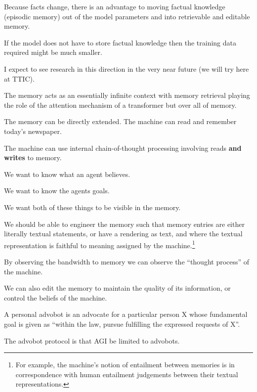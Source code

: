 {\vfill
Because facts change, there is an advantage to moving factual knowledge (episodic memory) out of the model parameters
and into retrievable and editable memory.

\vfill
If the model does not have to store factual knowledge then the training data required might be much smaller.

\vfill
I expect to see research in this direction in the very near future (we will try here at TTIC).


The memory acts as an essentially infinite context with memory retrieval playing the role of the attention mechanism of a transformer
but over all of memory.

\vfill
The memory can be directly extended. The machine can read and remember today's newspaper.

\vfill
The machine can use internal chain-of-thought processing involving reads {\bf and writes} to memory.



We want to know what an agent believes.

\vfill
We want to know the agents goals.

\vfill
We want both of these things to be visible in the memory.


\vfill
We should be able to engineer the memory such that memory entries are either literally textual statements,
or have a rendering as text, and where the textual representation is faithful to meaning assigned by the machine.\footnote{\Large For example, the machine's notion of entailment
between memories is in correspondence with human entailment judgements between their textual representations.}

\vfill
By observing the bandwidth to memory we can observe the ``thought process'' of the machine.

\vfill
We can also edit the memory to maintain the quality of its information, or control the beliefs of the machine.


A personal advobot is an advocate for a particular person X whose fundamental goal is given as ``within the law, pursue fulfilling the expressed requests of X''.

\vfill
The advobot protocol is that AGI be limited to advobots.

}
